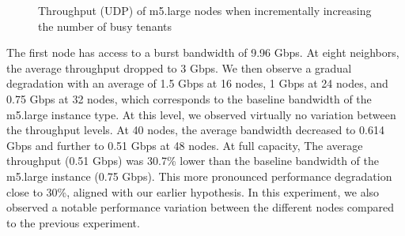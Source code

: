 \begin{figure}[H]
\caption{Throughput (UDP) of m5.large nodes when incrementally increasing the number of busy tenants}
\label{fig::boxplot}
\end{figure}
\noindent
The first node has access to a burst bandwidth of 9.96 Gbps.
At eight neighbors, the average throughput dropped to 3 Gbps. We then observe a gradual degradation 
with an average of 1.5 Gbps at 16 nodes, 1 Gbps at 24 nodes, and  0.75 Gbps at 32 nodes,  which 
corresponds to the baseline bandwidth of the m5.large instance type. 
At this level, we observed virtually no variation between the throughput levels. 
At 40 nodes, the average bandwidth decreased to 0.614 Gbps and further to 0.51 Gbps at 48 nodes.  
At full capacity, The average throughput (0.51 Gbps) was 30.7\% lower than the baseline bandwidth of the 
m5.large instance (0.75 Gbps). This more pronounced performance degradation close to 30\%, aligned
with our earlier hypothesis. In this experiment, we also observed a notable performance variation 
between the different nodes compared to the previous experiment.
